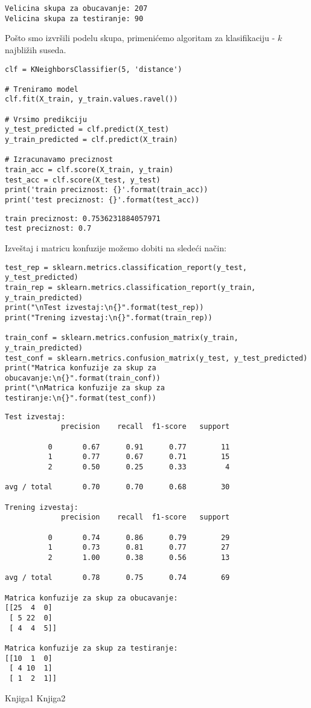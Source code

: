 \documentclass[12pt,a4paper]{article}
\begin{document}
\begin{verbatim}
Velicina skupa za obucavanje: 207
Velicina skupa za testiranje: 90
\end{verbatim}

Po\v sto smo izvr\v sili podelu skupa, primeni\' cemo algoritam za klasifikaciju - $k$ najbli\v zih suseda.

\begin{lstlisting}
clf = KNeighborsClassifier(5, 'distance')

# Treniramo model
clf.fit(X_train, y_train.values.ravel())

# Vrsimo predikciju
y_test_predicted = clf.predict(X_test)
y_train_predicted = clf.predict(X_train)

# Izracunavamo preciznost
train_acc = clf.score(X_train, y_train)
test_acc = clf.score(X_test, y_test)
print('train preciznost: {}'.format(train_acc))
print('test preciznost: {}'.format(test_acc))
\end{lstlisting}

\begin{verbatim}
train preciznost: 0.7536231884057971
test preciznost: 0.7
\end{verbatim}

Izve\v staj i matricu konfuzije mo\v zemo dobiti na slede\' ci na\v cin:

\begin{lstlisting}
test_rep = sklearn.metrics.classification_report(y_test, y_test_predicted)
train_rep = sklearn.metrics.classification_report(y_train, y_train_predicted)
print("\nTest izvestaj:\n{}".format(test_rep))
print("Trening izvestaj:\n{}".format(train_rep))

train_conf = sklearn.metrics.confusion_matrix(y_train, y_train_predicted)
test_conf = sklearn.metrics.confusion_matrix(y_test, y_test_predicted)
print("Matrica konfuzije za skup za obucavanje:\n{}".format(train_conf))
print("\nMatrica konfuzije za skup za testiranje:\n{}".format(test_conf))
\end{lstlisting}

\begin{verbatim}
Test izvestaj:
             precision    recall  f1-score   support

          0       0.67      0.91      0.77        11
          1       0.77      0.67      0.71        15
          2       0.50      0.25      0.33         4

avg / total       0.70      0.70      0.68        30

Trening izvestaj:
             precision    recall  f1-score   support

          0       0.74      0.86      0.79        29
          1       0.73      0.81      0.77        27
          2       1.00      0.38      0.56        13

avg / total       0.78      0.75      0.74        69

Matrica konfuzije za skup za obucavanje:
[[25  4  0]
 [ 5 22  0]
 [ 4  4  5]]

Matrica konfuzije za skup za testiranje:
[[10  1  0]
 [ 4 10  1]
 [ 1  2  1]]
\end{verbatim}


\begin{thebibliography}{9}
  Knjiga1
  Knjiga2
\end{thebibliography}
\end{document}
